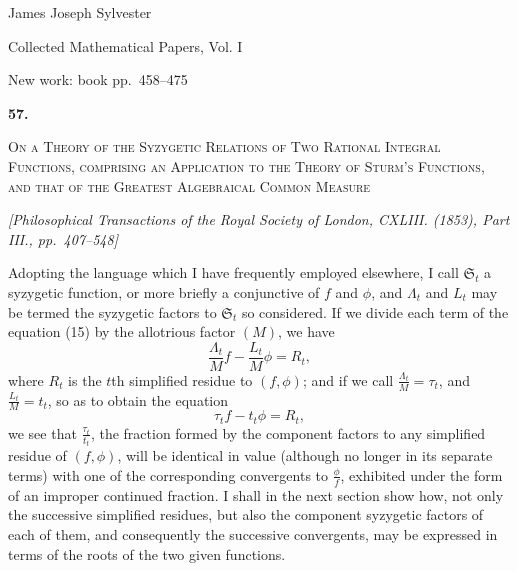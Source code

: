 \documentclass[11pt]{article}
\newcommand{\paperhead}[3]{%
  \clearpage
  \begin{center}
  {\Large\bfseries #1.}\par\vspace{0.85em}
  {\large\scshape #2}\par\vspace{0.6em}
  {\itshape [#3]}\par
  \end{center}\vspace{0.4em}}
\newcommand{\sourcepage}[1]{\marginpar{\scriptsize p.~#1}}
\begin{document}
\begin{center}
{\Large James Joseph Sylvester}\par\vspace{0.25em}
{\large Collected Mathematical Papers, Vol. I}\par\vspace{0.25em}
{\normalsize New work: book pp.~458--475}\par
\end{center}
\thispagestyle{empty}
\vspace{0.75em}

\paperhead{57}{On a Theory of the Syzygetic Relations of Two Rational Integral Functions, comprising an Application to the Theory of Sturm's Functions, and that of the Greatest Algebraical Common Measure}{Philosophical Transactions of the Royal Society of London, CXLIII. (1853), Part III., pp.~407--548}

\providecommand{\sbrk}[2]{\left[\begin{array}{c}#1\\#2\end{array}\right]}
\providecommand{\sbrkt}[2]{\left[\begin{array}{c}\scriptstyle #1\\[-0.2em]\scriptstyle #2\end{array}\right]}
\providecommand{\Syz}{\mathfrak{S}}

\sourcepage{458}
Adopting the language which I have frequently employed elsewhere, I call $\Syz_t$ a syzygetic function, or more briefly a conjunctive of $f$ and $\phi$, and $\Lambda_t$ and $L_t$ may be termed the syzygetic factors to $\Syz_t$ so considered. If we divide each term of the equation (15) by the allotrious factor $(M)$, we have
\[
\frac{\Lambda_t}{M}f-\frac{L_t}{M}\phi=R_t,
\]
where $R_t$ is the $t$th simplified residue to $(f,\phi)$; and if we call $\frac{\Lambda_t}{M}=\tau_t$, and $\frac{L_t}{M}=t_t$, so as to obtain the equation
\[
\tau_tf-t_t\phi=R_t,\tag{16}
\]
we see that $\frac{\tau_t}{t_t}$, the fraction formed by the component factors to any simplified residue of $(f,\phi)$, will be identical in value (although no longer in its separate terms) with one of the corresponding convergents to $\frac{\phi}{f}$, exhibited under the form of an improper continued fraction. I shall in the next section show how, not only the successive simplified residues, but also the component syzygetic factors of each of them, and consequently the successive convergents, may be expressed in terms of the roots of the two given functions.
\end{document}
